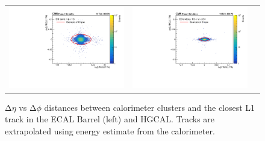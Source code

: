  \begin{figure}[tbh!]
 \begin{center}
  \begin{tabular}{ccc}
   \includegraphics[width=.45\linewidth]{figures/Part2/Upgrade/DR_barrel_new}&
   \includegraphics[width=.45\linewidth]{figures/Part2/Upgrade/DR_endcap_new}&
  \end{tabular}
  \caption{$\mathrm{\Delta}\eta$ vs $\mathrm{\Delta}\phi$ distances between calorimeter clusters and the closest L1 track in the \ac{ECAL} Barrel (left) and \ac{HGCAL}. Tracks are extrapolated using energy estimate from the calorimeter.}
 \label{fig:DR_electron}
 \end{center}
\end{figure}

